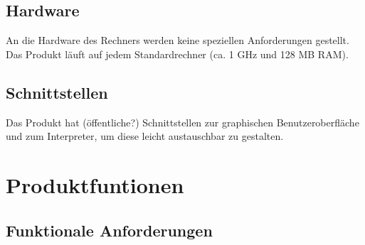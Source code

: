 \documentclass[parskip=full]{scrartcl}
\begin{document}
\subsection{Hardware}
An die Hardware des Rechners werden keine speziellen Anforderungen gestellt. Das Produkt läuft auf jedem Standardrechner (ca. 1 GHz und 128 MB RAM).

\subsection{Schnittstellen}
Das Produkt hat (öffentliche?) Schnittstellen zur graphischen Benutzeroberfläche und zum Interpreter, um diese leicht austauschbar zu gestalten.


\section{Produktfuntionen}
	 	\subsection{Funktionale Anforderungen}
\end{document}
